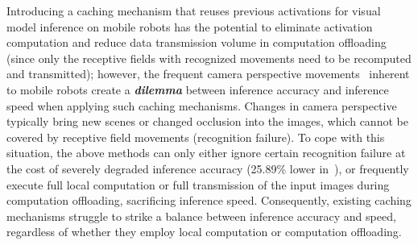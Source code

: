 Introducing a caching mechanism that reuses previous activations for visual model inference on mobile robots has the potential to eliminate activation computation and reduce data transmission volume in computation offloading (since only the receptive fields with recognized movements need to be recomputed and transmitted);
however, the frequent camera perspective movements~\cite{cavigelli_cbinfer_2017,huynh_deepmon_2017} inherent to mobile robots create a \textbf{\textit{dilemma}} between inference accuracy and inference speed when applying such caching mechanisms.
Changes in camera perspective typically bring new scenes or changed occlusion into the images, which cannot be covered by receptive field movements (recognition failure).
To cope with this situation, the above methods can only either ignore certain recognition failure at the cost of severely degraded inference accuracy (25.89\% lower in~\cite{huynh_deepmon_2017}), or frequently execute full local computation or full transmission of the input images during computation offloading, sacrificing inference speed.
Consequently, existing caching mechanisms struggle to strike a balance between inference accuracy and speed, regardless of whether they employ local computation or computation offloading.

